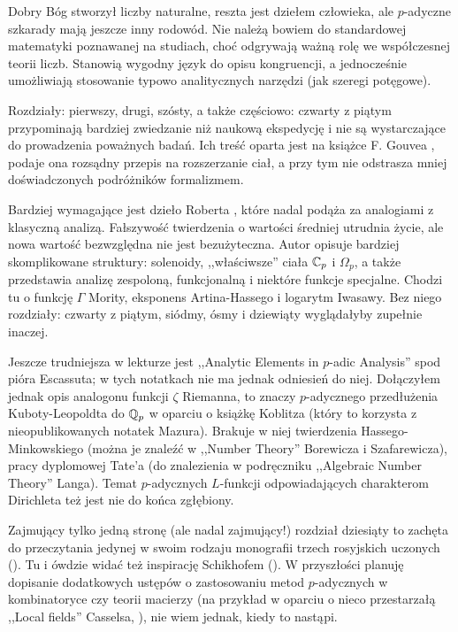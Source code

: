 Dobry Bóg stworzył liczby naturalne, reszta jest dziełem człowieka, ale $p$-adyczne szkarady mają jeszcze inny rodowód.
Nie należą bowiem do standardowej matematyki poznawanej na studiach, choć odgrywają ważną rolę we współczesnej teorii liczb.
Stanowią wygodny język do opisu kongruencji, a jednocześnie umożliwiają stosowanie typowo analitycznych narzędzi (jak szeregi potęgowe).

Rozdziały: pierwszy, drugi, szósty, a także częściowo: czwarty z piątym przypominają bardziej zwiedzanie niż naukową ekspedycję i nie są wystarczające do prowadzenia poważnych badań.
Ich treść oparta jest na książce F. Gouvea \cite{gouvea97}, podaje ona rozsądny przepis na rozszerzanie ciał, a przy tym nie odstrasza mniej doświadczonych podróżników formalizmem.

Bardziej wymagające jest dzieło Roberta \cite{robert99}, które nadal podąża za analogiami z klasyczną analizą.
Fałszywość twierdzenia o wartości średniej utrudnia życie, ale nowa wartość bezwzględna nie jest bezużyteczna.
Autor opisuje bardziej skomplikowane struktury: solenoidy, ,,właściwsze'' ciała $\mathbb C_p$ i $\Omega_p$, a także przedstawia analizę zespoloną, funkcjonalną i niektóre funkcje specjalne.
Chodzi tu o funkcję $\Gamma$ Mority, eksponens Artina-Hassego i logarytm Iwasawy.
Bez niego rozdziały: czwarty z piątym, siódmy, ósmy i dziewiąty wyglądałyby zupełnie inaczej.

Jeszcze trudniejsza w lekturze jest ,,Analytic Elements in $p$-adic Analysis'' spod pióra Escassuta; w tych notatkach nie ma jednak odniesień do niej. 
Dołączyłem jednak opis analogonu funkcji $\zeta$ Riemanna, to znaczy $p$-adycznego przedłużenia Kuboty-Leopoldta do $\mathbb Q_p$ w oparciu o książkę Koblitza \cite{koblitz84} (który to korzysta z nieopublikowanych notatek Mazura).
Brakuje w niej twierdzenia Hassego-Minkowskiego (można je znaleźć w ,,Number Theory'' Borewicza i Szafarewicza), pracy dyplomowej Tate'a (do znalezienia w podręczniku ,,Algebraic Number Theory'' Langa).
Temat $p$-adycznych $L$-funkcji odpowiadających charakterom Dirichleta też jest nie do końca zgłębiony.

Zajmujący tylko jedną stronę (ale nadal zajmujący!) rozdział dziesiąty to zachęta do przeczytania jedynej w swoim rodzaju monografii trzech rosyjskich uczonych (\cite{volovich94}).
Tu i ówdzie widać też inspirację Schikhofem (\cite{schikhof85}).
W przyszłości planuję dopisanie dodatkowych ustępów o zastosowaniu metod $p$-adycznych w kombinatoryce czy teorii macierzy (na przykład w oparciu o nieco przestarzałą ,,Local fields'' Casselsa, \cite{cassels86}), nie wiem jednak, kiedy to nastąpi.

